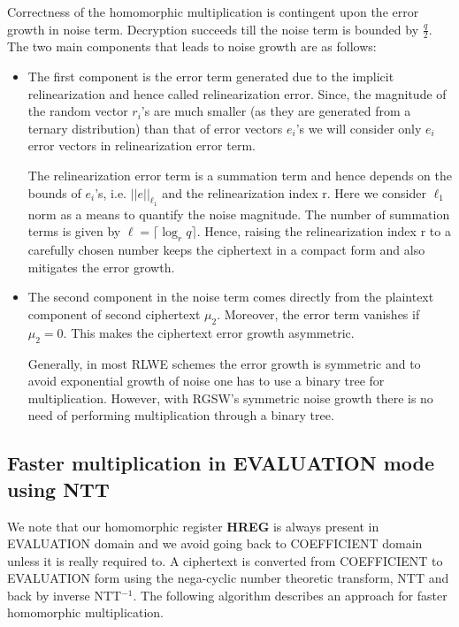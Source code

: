 \documentclass[10pt,journal,compsoc]{IEEEtran}
\theoremstyle{definition}
\begin{document}
Correctness of the homomorphic multiplication is contingent upon the error growth in noise term. Decryption succeeds till the noise term is bounded by $\frac{q}{2}$. The two main components that leads to noise growth are as follows:
\begin{itemize}

\item The first component is the error term generated due to the implicit relinearization and hence called relinearization error. Since, the magnitude of the random vector $r_i$'s are much smaller (as they are generated from a ternary distribution) than that of error vectors $e_i$'s we will consider only $e_i$ error vectors in relinearization error term. 

The relinearization error term is a summation term and hence depends on the bounds of $e_i$'s, i.e. $||e||_{\ell_1}$ and the relinearization index r. Here we consider $\ell_1$ norm as a means to quantify the noise magnitude. The number of summation terms is given by $\ell = \lceil \log_r{q} \rceil$. Hence, raising the relinearization index r to a carefully chosen number keeps the ciphertext in a compact form and also mitigates the error growth.
\\
\item The second component in the noise term comes directly from the plaintext component of second ciphertext $\mu_2$. Moreover, the error term vanishes if $\mu_2 = 0$. This makes the ciphertext error growth asymmetric. 

Generally, in most RLWE schemes the error growth is symmetric and to avoid exponential growth of noise one has to use a binary tree for multiplication. However, with RGSW's symmetric noise growth there is no need of performing multiplication through a binary tree.  
\end{itemize} 
 
\subsection{Faster multiplication in EVALUATION mode using NTT}
We note that our homomorphic register \textbf{HREG} is always present in EVALUATION domain and we avoid going back to COEFFICIENT domain unless it is really required to. A ciphertext is converted from COEFFICIENT to EVALUATION form using the nega-cyclic number theoretic transform, NTT and back by inverse NTT$^{-1}$. The following algorithm describes an approach for faster homomorphic multiplication.
 
\end{document}
